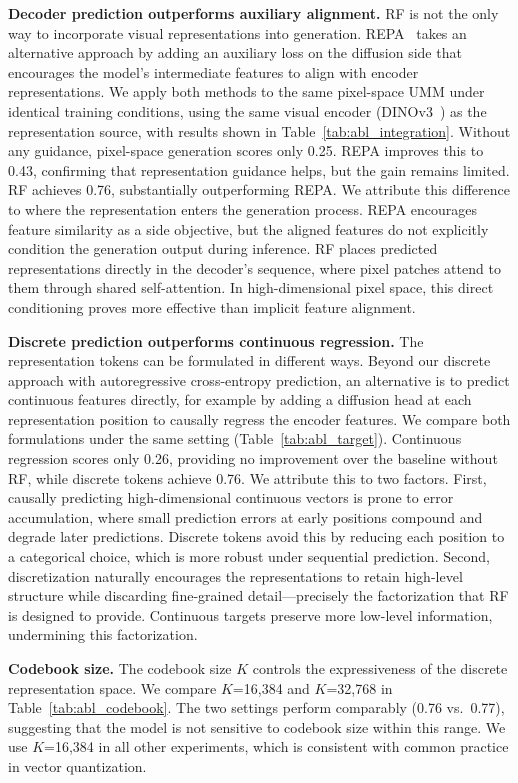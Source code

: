\documentclass{llmxive}
\begin{document}
\textbf{Decoder prediction outperforms auxiliary alignment.}
RF is not the only way to incorporate visual representations into
generation. REPA~\cite{repa} takes an alternative approach by
adding an auxiliary loss on the diffusion side that encourages the
model's intermediate features to align with encoder representations.
We apply both methods to the same pixel-space UMM under identical
training conditions, using the same visual encoder (DINOv3~\cite{dinov3}) as the
representation source, with results shown in
Table~\ref{tab:abl_integration}. Without any guidance, pixel-space
generation scores only 0.25. REPA improves this to 0.43, confirming
that representation guidance helps, but the gain remains limited.
RF achieves 0.76, substantially outperforming REPA. We attribute
this difference to where the representation enters the generation
process. REPA encourages feature similarity as a side objective,
but the aligned features do not explicitly condition the generation
output during inference. RF places predicted representations directly in the
decoder's sequence, where pixel patches attend to them through
shared self-attention. In high-dimensional pixel space, this direct
conditioning proves more effective than implicit feature
alignment.

\textbf{Discrete prediction outperforms continuous regression.}
The representation tokens can be formulated in different ways. Beyond our discrete approach with autoregressive cross-entropy prediction, an alternative is to predict continuous features directly, for example by adding a diffusion head at each representation position to causally regress the encoder features. We compare both formulations under the same setting (Table~\ref{tab:abl_target}). Continuous regression scores only 0.26, providing no improvement over the baseline without RF, while discrete tokens achieve 0.76. We attribute this to two factors. First, causally predicting high-dimensional continuous vectors is prone to error accumulation, where small prediction errors at early positions compound and degrade later predictions. Discrete tokens avoid this by reducing each position to a categorical choice, which is more robust under sequential prediction. Second, discretization naturally encourages the representations to retain high-level structure while discarding fine-grained detail---precisely the factorization that RF is designed to provide. Continuous targets preserve more low-level information, undermining this factorization.

\textbf{Codebook size.} The codebook size $K$ controls the expressiveness of the discrete representation space. We compare $K$=16,384 and $K$=32,768 in Table~\ref{tab:abl_codebook}. The two settings perform comparably (0.76 vs.\ 0.77), suggesting that the model is not sensitive to codebook size within this range. We use $K$=16,384 in all other experiments, which is consistent with common practice in vector quantization.
\end{document}
